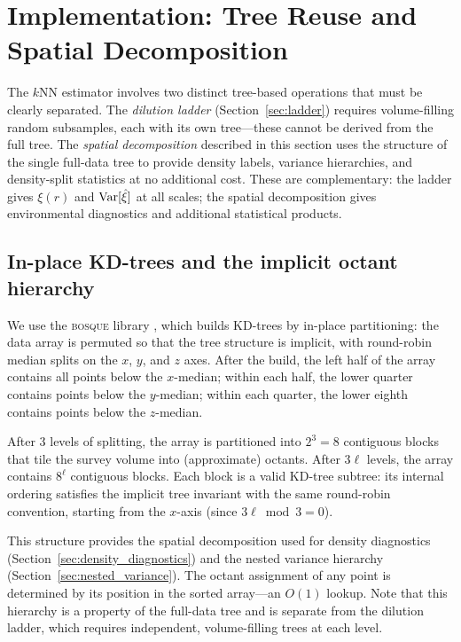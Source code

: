 \section{Implementation: Tree Reuse and Spatial Decomposition}
\label{sec:implementation}

The $k$NN estimator involves two distinct tree-based operations that must be clearly separated.  The \emph{dilution ladder} (Section~\ref{sec:ladder}) requires volume-filling random subsamples, each with its own tree---these cannot be derived from the full tree.  The \emph{spatial decomposition} described in this section uses the structure of the single full-data tree to provide density labels, variance hierarchies, and density-split statistics at no additional cost.  These are complementary: the ladder gives $\xi(r)$ and $\mathrm{Var}[\hat{\xi}]$ at all scales; the spatial decomposition gives environmental diagnostics and additional statistical products.

\subsection{In-place KD-trees and the implicit octant hierarchy}
\label{sec:inplace}

We use the \textsc{bosque} library \citep{bosque}, which builds KD-trees by in-place partitioning: the data array is permuted so that the tree structure is implicit, with round-robin median splits on the $x$, $y$, and $z$ axes.  After the build, the left half of the array contains all points below the $x$-median; within each half, the lower quarter contains points below the $y$-median; within each quarter, the lower eighth contains points below the $z$-median.

After 3 levels of splitting, the array is partitioned into $2^3 = 8$ contiguous blocks that tile the survey volume into (approximate) octants.  After $3\ell$ levels, the array contains $8^\ell$ contiguous blocks.  Each block is a valid KD-tree subtree: its internal ordering satisfies the implicit tree invariant with the same round-robin convention, starting from the $x$-axis (since $3\ell \bmod 3 = 0$).

This structure provides the spatial decomposition used for density diagnostics (Section~\ref{sec:density_diagnostics}) and the nested variance hierarchy (Section~\ref{sec:nested_variance}).  The octant assignment of any point is determined by its position in the sorted array---an $O(1)$ lookup.  Note that this hierarchy is a property of the full-data tree and is separate from the dilution ladder, which requires independent, volume-filling trees at each level.

